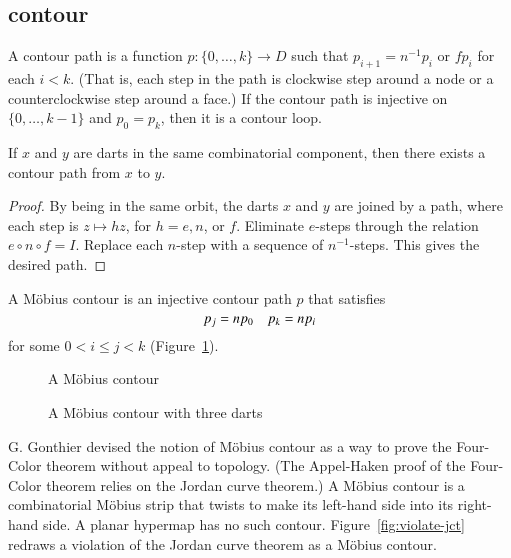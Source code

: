 \subsection{contour}

\begin{definition}  A contour path is a function $p:\{0,\ldots,k\}\to D$
such that $p_{i+1} =
n^{-1} p_i$ or $f p_i$ for each $i<k$.  (That is, each
step in the path is clockwise step around a node or a
counterclockwise step around a face.)   If the contour path
is injective on $\{0,\ldots,k-1\}$
and  $p_0 = p_k$, then it is a contour loop.
\end{definition}

\begin{lemma}  If $x$ and $y$ are darts
in the same combinatorial component, then there exists
a contour path from $x$ to $y$.
\end{lemma}

\begin{proof} 
By being in the same orbit, the darts
$x$ and $y$ are joined by a path, where each step
is $z\mapsto h z$, for $h=e,n$, or $f$.  Eliminate $e$-steps
through the relation $e\circ
n\circ f = I$.   Replace each $n$-step with a sequence of
$n^{-1}$-steps.  This gives the desired path.
\end{proof}

\begin{definition} A M\"obius contour is an
injective contour path $p$ that satisfies
    \begin{equation}
    \tlabel{eqn:mobius}
    p_j = n p_0\quad p_k = n p_i
    \end{equation}
for some $0 < i\le j< k$ (Figure~\ref{fig:mobius}).
\end{definition}

\begin{figure}[htb]
  \centering
  \caption{A M\"obius contour}
  \label{fig:mobius}
\end{figure}

\begin{figure}[htb]
  \centering
  \caption{A M\"obius contour with three darts}
  \label{fig:3m}
\end{figure}


\begin{remark}
G. Gonthier devised the notion of M\"obius contour
as a way to prove the Four-Color theorem without appeal
to topology.  (The Appel-Haken
proof of the Four-Color theorem relies on the Jordan
curve theorem.)  A M\"obius contour is a 
combinatorial M\"obius strip that
twists to make 
its left-hand side into
its right-hand side.  A planar hypermap has no such contour.  
Figure~\ref{fig:violate-jct}
redraws a violation of the Jordan curve theorem
as a M\"obius contour.   
\end{remark}

